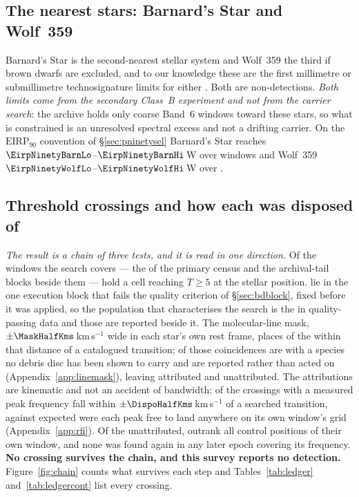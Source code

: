 \subsection{The nearest stars: Barnard's Star and Wolf~359}
\label{sec:barnardswolf}

Barnard's Star is the second-nearest stellar system and Wolf~359 the third if
brown dwarfs are excluded, and to our knowledge these are the first millimetre
or submillimetre technosignature limits for either \citep{Enriquez2017,
Price2020, Margot2023}. Both are non-detections. \emph{Both limits come from
the secondary Class~B experiment and not from the carrier search}: the archive
holds only coarse Band~6 windows toward these stars, so what is constrained is
an unresolved spectral excess and not a drifting carrier. On the
$\mathrm{EIRP}_{90}$ convention of \S\ref{sec:pninetysel} Barnard's Star
reaches $\EirpNinetyBarnLo$--$\EirpNinetyBarnHi$\,W over \NWinBarn{} windows
and Wolf~359 $\EirpNinetyWolfLo$--$\EirpNinetyWolfHi$\,W over \NWinWolf.

\subsection{Threshold crossings and how each was disposed of}
\label{sec:technosearch}

\emph{The result is a chain of three tests, and it is read in one direction.}
Of the windows the search covers --- the \NWindows{} of the primary census
and the archival-tail blocks beside them --- \EvNCrossRaw{} hold a cell
reaching $T\geq5$ at the stellar position. \EvNCrossFlag{} lie in the one
execution block that fails the quality criterion of \S\ref{sec:bdblock}, fixed
before it was applied, so the population that characterises the search is the
\EvNCrossQp{} in quality-passing data and those \EvNCrossFlag{} are reported
beside it. The molecular-line mask, $\pm\MaskHalfKms$\,km\,s$^{-1}$ wide in
each star's own rest frame, places \MkNCoinc{} of the \EvNCrossQp{} within
that distance of a catalogued transition; \MkNSODecideWord{} of those
coincidences are with a species no debris disc has been shown to carry and are
reported rather than acted on (Appendix~\ref{app:linemask}), leaving
\EvNAttrQp{} attributed and \EvNUnattrQp{} unattributed. The attributions are
kinematic and not an accident of bandwidth: \AppMTubeObs{} of the
\AppMNCrossF{} crossings with a measured peak frequency fall within
$\pm\DispoHalfKms$\,km\,s$^{-1}$ of a searched transition, against
\AppMTubeNull{} expected were each peak free to land anywhere on its own
window's grid (Appendix~\ref{app:rfi}). Of the unattributed,
\EvNRankQp{} outrank all \NCtrl{} control positions of their own window, and
none was found again in any later epoch covering its frequency. \textbf{No
crossing survives the chain, and this survey reports no detection.}
Figure~\ref{fig:chain} counts what survives each step and
Tables~\ref{tab:ledger} and~\ref{tab:ledgercont} list every crossing.

